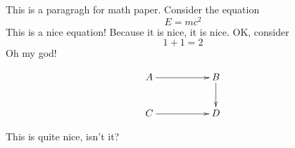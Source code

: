 

This is a paragragh for math paper. Consider the equation
$$
E=mc^2
$$
This is a nice equation! Because it is nice, it is nice. OK, consider
$$
1+1=2
$$
Oh my god!

$$
\xymatrix{
A\ar[rr]&&B\ar[d]\\
C\ar[rr]&&D\\
}
$$

This is quite nice, isn't it?




